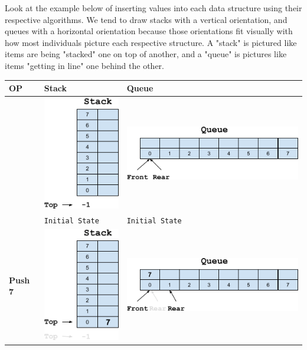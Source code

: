 Look at the example below of inserting values into each data structure using their respective algorithms. We tend to draw stacks with a vertical orientation, and queues with a horizontal orientation because those orientations fit visually with how most individuals picture each respective structure. A "stack" is pictured like items are being "stacked" one on top of another, and a "queue" is pictures like items "getting in line" one behind the other. 

\begin{longtable}{|M{2cm}|M{6cm}|M{6cm}|}
    \hline
    \textbf{OP} & \textbf{Stack} & \textbf{Queue} \\
    \hline
    & \includegraphics[scale=.35]{images/stack_intro_01.png} & \includegraphics[scale=.35]{images/queue_intro_01.png}\\
    & \texttt{Initial State} & \texttt{Initial State} \\
    \hline
    \textbf{Push 7} & \includegraphics[scale=.35]{images/stack_intro_02.png} & \includegraphics[scale=.35]{images/queue_intro_02.png} \\

\end{longtable}
